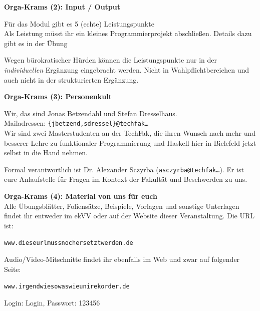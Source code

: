 \documentclass{beamer}
\begin{document}
  
  \begin{frame}
    \begin{center}
    \Large\textbf{Orga-Krams (2): Input / Output}\\ \bigskip \normalsize
    
    Für das Modul gibt es 5 (echte) Leistungspunkte\\
    Als Leistung müsst ihr ein kleines Programmierprojekt abschließen.
    Details dazu gibt es in der Übung\bigskip
    
    Wegen bürokratischer Hürden können die Leistungspunkte nur in der \emph{individuellen} Ergänzung eingebracht werden. Nicht in Wahlpflichtbereichen und auch nicht in der strukturierten Ergänzung.
    \end{center}
  \end{frame}
  
  
  \begin{frame}
    \begin{center}
    \Large\textbf{Orga-Krams (3): Personenkult}\\ \bigskip \normalsize

	Wir, das sind Jonas Betzendahl und Stefan Dresselhaus.\\
	Mailadressen: \texttt{\{jbetzend,sdressel\}@techfak\dots}\\ \bigskip
	Wir sind zwei Masterstudenten an der TechFak, die ihren Wunsch nach mehr und besserer Lehre zu funktionaler Programmierung und Haskell hier in Bielefeld jetzt selbst in die Hand nehmen. \bigskip    
    
    Formal verantwortlich ist Dr. Alexander Sczyrba (\texttt{asczyrba@techfak\dots}). Er ist eure Anlaufstelle für Fragen im Kontext der Fakultät und Beschwerden zu uns.
    \end{center}
  \end{frame}
  
  
  \begin{frame}
    \begin{center}
	\Large\textbf{Orga-Krams (4): Material von uns für euch}\\ \bigskip \normalsize
	Alle Übungsblätter, Foliensätze, Beispiele, Vorlagen und sonstige Unterlagen findet ihr entweder im ekVV oder auf der Website dieser Veranstaltung. Die URL ist:
	
	\bigskip\texttt{www.dieseurlmussnochersetztwerden.de}\bigskip
	
	Audio/Video-Mitschnitte findet ihr ebenfalls im Web und zwar auf folgender Seite:
	
	\bigskip\texttt{www.irgendwiesowaswieunirekorder.de}\bigskip
	
	Login: Login, Passwort: 123456
    \end{center}
  \end{frame}
  
\end{document}
